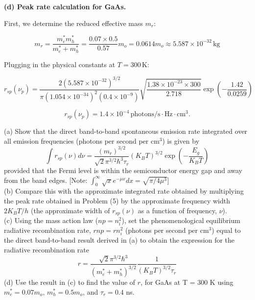 \textbf{(d) Peak rate calculation for GaAs.}

First, we determine the reduced effective mass $m_r$:

\begin{equation*}
  m_r = \frac{m_e^* m_h^*}{m_e^* + m_h^*} = \frac{0.07 \times 0.5}{0.57} m_o = 0.0614 m_o \approx 5.587 \times 10^{-32}\,\text{kg}
\end{equation*}

Plugging in the physical constants at $T = 300$\,K:

\begin{equation*}
  r_{sp}(\nu_p) = \frac{2(5.587\times 10^{-32})^{3/2}}{\pi(1.054\times 10^{-34})^2 (0.4\times 10^{-9})} \sqrt{\frac{1.38\times 10^{-23} \times 300}{2.718}} \exp\left(-\frac{1.42}{0.0259}\right)
\end{equation*}

\begin{equation*}
  \boxed{r_{sp}(\nu_p) = 1.4 \times 10^{-4}\,\text{photons/s}\cdot\text{Hz}\cdot\text{cm}^3.}
\end{equation*}

\begin{question}[Question 12]
(a) Show that the direct band-to-band spontaneous emission rate integrated over all emission frequencies (photons per second per cm$^3$) is given by
\begin{equation*}
\int r_{sp}(\nu) d\nu = \frac{(m_r)^{3/2}}{\sqrt{2}\pi^{3/2}\hbar^3\tau_r} (K_B T)^{3/2} \exp\left(-\frac{E_g}{K_B T}\right)
\end{equation*}
provided that the Fermi level is within the semiconductor energy gap and away from the band edges. [Note: $\int_0^\infty \sqrt{x} e^{-\mu x} dx = \sqrt{\pi/4\mu^3}$]\\
(b) Compare this with the approximate integrated rate obtained by multiplying the peak rate obtained in Problem (5) by the approximate frequency width $2K_B T/h$ (the approximate width of $r_{sp}(\nu)$ as a function of frequency, $\nu$).\\
(c) Using the mass action law ($np = n_i^2$), set the phenomenological equilibrium radiative recombination rate, $rnp = rn_i^2$ (photons per second per cm$^3$) equal to the direct band-to-band result derived in (a) to obtain the expression for the radiative recombination rate
\begin{equation*}
r = \frac{\sqrt{2}\pi^{3/2}\hbar^3}{(m_e^* + m_h^*)^{3/2}} \frac{1}{(K_B T)^{3/2}\tau_r}
\end{equation*}
(d) Use the result in (c) to find the value of $r$, for GaAs at T = 300 K using $m_e^* = 0.07 m_o$, $m_h^* = 0.5 m_o$, and $\tau_r = 0.4$ ns.
\end{question}


